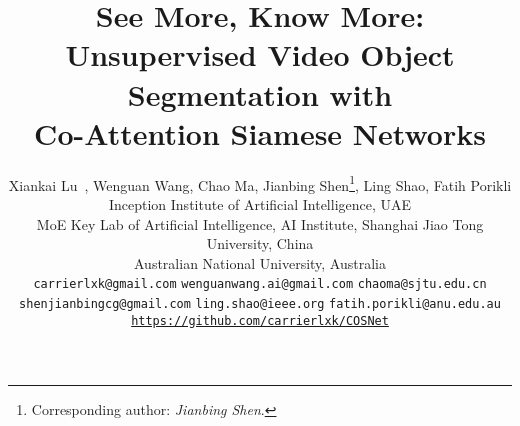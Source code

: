 \documentclass[10pt,twocolumn,letterpaper]{article}
\begin{document}
\title{See More, Know More: Unsupervised Video Object Segmentation with \\Co-Attention Siamese Networks}
\author{Xiankai Lu~,\hspace{1pt} Wenguan Wang,\hspace{1pt} Chao Ma,\hspace{1pt}   Jianbing Shen\thanks{Corresponding author: \textit{Jianbing Shen}. }, \hspace{2pt}  Ling Shao,\hspace{1pt}  Fatih Porikli  \\
	\small{} \small Inception Institute of Artificial Intelligence, UAE \hspace{0pt} \\
	\small{} \small MoE Key Lab of Artificial Intelligence, AI Institute, Shanghai Jiao Tong University, China \hspace{0pt} \\
	\small{} \small Australian National University, Australia \\
	{\tt\small carrierlxk@gmail.com} \hspace{2pt}
	{\tt\small wenguanwang.ai@gmail.com} \hspace{2pt} {\tt\small chaoma@sjtu.edu.cn} \\
		{\tt\small shenjianbingcg@gmail.com} \hspace{2pt} {\tt\small ling.shao@ieee.org} \hspace{2pt}
		{\tt\small fatih.porikli@anu.edu.au} \\
		{\tt\small \url{https://github.com/carrierlxk/COSNet}}
}



\maketitle
\thispagestyle{empty}
\end{document}
